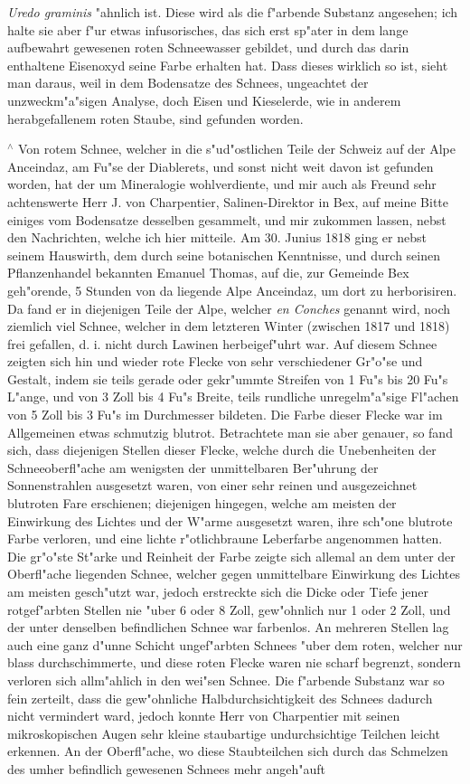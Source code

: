 \documentclass[a4paper, 11pt, oneside, polutonikogreek, german]{article}
\begin{document}
\emph{Uredo graminis} "ahnlich ist. Diese wird als die f"arbende Substanz angesehen; ich halte sie aber f"ur etwas infusorisches, das sich erst sp"ater in dem lange aufbewahrt gewesenen roten Schneewasser gebildet, und durch das darin enthaltene Eisenoxyd seine Farbe erhalten hat. Dass dieses wirklich so ist, sieht man daraus, weil in dem Bodensatze des Schnees, ungeachtet der unzweckm"a"sigen Analyse, doch Eisen und Kieselerde, wie in anderem herabgefallenem roten Staube, sind gefunden worden.

$^\wedge$ Von rotem Schnee, welcher in die s"ud"ostlichen Teile der Schweiz auf der Alpe Anceindaz, am Fu"se der Diablerets, und sonst nicht weit davon ist gefunden worden, hat der um Mineralogie wohlverdiente, und mir auch als Freund sehr achtenswerte Herr J. von Charpentier, Salinen-Direktor in Bex, auf meine Bitte einiges vom Bodensatze desselben gesammelt, und mir zukommen lassen, nebst den Nachrichten, welche ich hier mitteile. Am 30. Junius 1818 ging er nebst seinem Hauswirth, dem durch seine botanischen Kenntnisse, und durch seinen Pflanzenhandel bekannten Emanuel Thomas, auf die, zur Gemeinde Bex geh"orende, 5 Stunden von da liegende Alpe Anceindaz, um dort zu herborisiren. Da fand er in diejenigen Teile der Alpe, welcher \emph{en Conches} genannt wird, noch ziemlich viel Schnee, welcher in dem letzteren Winter (zwischen 1817 und 1818) frei gefallen, d. i. nicht durch Lawinen herbeigef"uhrt war. Auf diesem Schnee zeigten sich hin und wieder rote Flecke von sehr verschiedener Gr"o"se und Gestalt, indem sie teils gerade oder gekr"ummte Streifen von 1 Fu"s bis 20 Fu"s L"ange, und von 3 Zoll bis 4 Fu"s Breite, teils rundliche unregelm"a"sige Fl"achen von 5 Zoll bis 3 Fu"s im Durchmesser bildeten. Die Farbe dieser Flecke war im Allgemeinen etwas schmutzig blutrot. Betrachtete man sie aber genauer, so fand sich, dass diejenigen Stellen dieser Flecke, welche durch die Unebenheiten der Schneeoberfl"ache am wenigsten der unmittelbaren Ber"uhrung der Sonnenstrahlen ausgesetzt waren, von einer sehr reinen und ausgezeichnet blutroten Fare erschienen; diejenigen hingegen, welche am meisten der Einwirkung des Lichtes und der W"arme ausgesetzt waren, ihre sch"one blutrote Farbe verloren, und eine lichte r"otlichbraune Leberfarbe angenommen hatten. Die gr"o"ste St"arke und Reinheit der Farbe zeigte sich allemal an dem unter der Oberfl"ache liegenden Schnee, welcher gegen unmittelbare Einwirkung des Lichtes am meisten gesch"utzt war, jedoch erstreckte sich die Dicke oder Tiefe jener rotgef"arbten Stellen nie "uber 6 oder 8 Zoll, gew"ohnlich nur 1 oder 2 Zoll, und der unter denselben befindlichen Schnee war farbenlos. An mehreren Stellen lag auch eine ganz d"unne Schicht ungef"arbten Schnees "uber dem roten, welcher nur blass durchschimmerte, und diese roten Flecke waren nie scharf begrenzt, sondern verloren sich allm"ahlich in den wei"sen Schnee. Die f"arbende Substanz war so fein zerteilt, dass die gew"ohnliche Halbdurchsichtigkeit des Schnees dadurch nicht vermindert ward, jedoch konnte Herr von Charpentier mit seinen mikroskopischen Augen sehr kleine staubartige undurchsichtige Teilchen leicht erkennen. An der Oberfl"ache, wo diese Staubteilchen sich durch das Schmelzen des umher befindlich gewesenen Schnees mehr angeh"auft 
\end{document}
